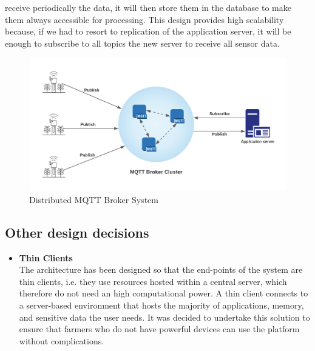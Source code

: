 \documentclass[10pt]{article} %
\begin{document}
\begin{itemize}
    receive periodically the data, it will then store them in the database to make them always 
    accessible for processing.
    This design provides high scalability because, if we had to resort to replication of the 
    application server, it will be enough to subscribe to all topics the new server to receive 
    all sensor data.
    \begin{figure}[h]
        \centering
        \includegraphics[scale=0.5]{images/mqtt.png}
        \caption{Distributed MQTT Broker System}
        \label{fig:ui_login}
    \end{figure}
\end{itemize}
\subsection{Other design decisions}
\begin{itemize}
    \item \textbf{Thin Clients}\\The architecture has been designed so that the end-points of the system 
    are thin clients, i.e. they use resources hosted within a central server, which therefore do not need an high 
    computational power. A thin client connects to a server-based environment that hosts the majority of 
    applications, memory, and sensitive data the user needs. It was decided to undertake this solution 
    to ensure that farmers who do not have powerful devices can use the platform without complications.
\end{itemize}
\end{document}
